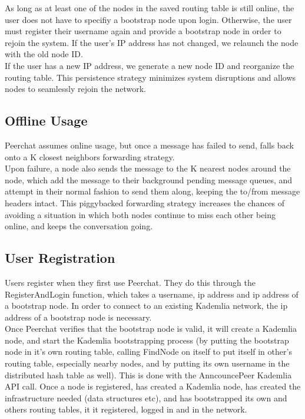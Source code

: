 \documentclass{article}
\begin{document}
As long as at least one of the nodes in the saved routing table is still online, the user does not have to specifiy a bootstrap node upon login.  Otherwise, the user must register their username again and provide a bootstrap node in order to rejoin the system. If the user's IP address has not changed, we relaunch the node with the old node ID. \\

If the user has a new IP address, we generate a new node ID and reorganize the routing table.
This persistence strategy minimizes system disruptions and allows nodes to seamlessly rejoin the network.

\subsection{Offline Usage}

Peerchat assumes online usage, but once a message has failed to send, falls back onto a K closest neighbors forwarding strategy. \\

Upon failure, a node also sends the message to the K nearest nodes around the node, which add the message to their background pending message queues, and attempt in their normal fashion to send them along, keeping the to/from message headers intact. This piggybacked forwarding strategy increases the chances of avoiding a situation in which both nodes continue to miss each other being online, and keeps the conversation going. 

\subsection{User Registration}

Users register when they first use Peerchat. They do this through the RegisterAndLogin function, which takes a username, ip address and ip address of a bootstrap node. In order to connect to an existing Kademlia network, the ip address of a bootstrap node is necessary. \\

Once Peerchat verifies that the bootstrap node is valid, it will create a Kademlia node, and start the Kademlia bootstrapping process (by putting the bootstrap node in it's own routing table, calling FindNode on itself to put itself in other's routing table, especially nearby nodes, and by putting its own username in the distributed hash table as well). This is done with the AnncouncePeer Kademlia API call. Once a node is registered, has created a Kademlia node, has created the infrastructure needed (data structures etc), and has bootstrapped its own and others routing tables, it it registered, logged in and in the network. \\
\end{document}

